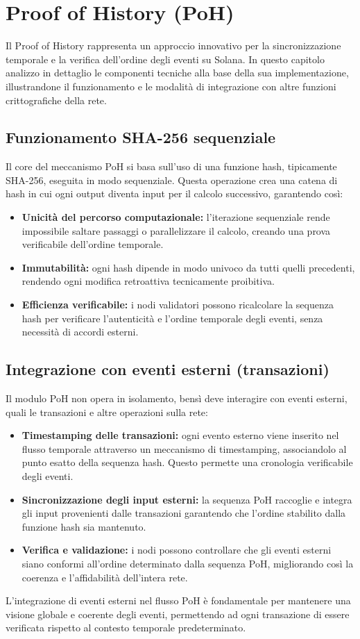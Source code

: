 \documentclass[a4paper,12pt]{report}
\begin{document}
	\section{Proof of History (PoH)}
	Il Proof of History rappresenta un approccio innovativo per la sincronizzazione temporale e la verifica dell’ordine degli eventi su Solana. In questo capitolo analizzo in dettaglio le componenti tecniche alla base della sua implementazione, illustrandone il funzionamento e le modalità di integrazione con altre funzioni crittografiche della rete.
	
	\subsection{Funzionamento SHA-256 sequenziale}
	Il core del meccanismo PoH si basa sull’uso di una funzione hash, tipicamente SHA-256, eseguita in modo sequenziale. Questa operazione crea una catena di hash in cui ogni output diventa input per il calcolo successivo, garantendo così:
	\begin{itemize}
		\item \textbf{Unicità del percorso computazionale:} l’iterazione sequenziale rende impossibile saltare passaggi o parallelizzare il calcolo, creando una prova verificabile dell’ordine temporale.
		\item \textbf{Immutabilità:} ogni hash dipende in modo univoco da tutti quelli precedenti, rendendo ogni modifica retroattiva tecnicamente proibitiva.
		\item \textbf{Efficienza verificabile:} i nodi validatori possono ricalcolare la sequenza hash per verificare l’autenticità e l’ordine temporale degli eventi, senza necessità di accordi esterni.
	\end{itemize}
	
	\subsection{Integrazione con eventi esterni (transazioni)}
	Il modulo PoH non opera in isolamento, bensì deve interagire con eventi esterni, quali le transazioni e altre operazioni sulla rete:
	\begin{itemize}
		\item \textbf{Timestamping delle transazioni:} ogni evento esterno viene inserito nel flusso temporale attraverso un meccanismo di timestamping, associandolo al punto esatto della sequenza hash. Questo permette una cronologia verificabile degli eventi.
		\item \textbf{Sincronizzazione degli input esterni:} la sequenza PoH raccoglie e integra gli input provenienti dalle transazioni garantendo che l’ordine stabilito dalla funzione hash sia mantenuto.
		\item \textbf{Verifica e validazione:} i nodi possono controllare che gli eventi esterni siano conformi all’ordine determinato dalla sequenza PoH, migliorando così la coerenza e l’affidabilità dell’intera rete.
	\end{itemize}
	L’integrazione di eventi esterni nel flusso PoH è fondamentale per mantenere una visione globale e coerente degli eventi, permettendo ad ogni transazione di essere verificata rispetto al contesto temporale predeterminato.
	
\end{document}
